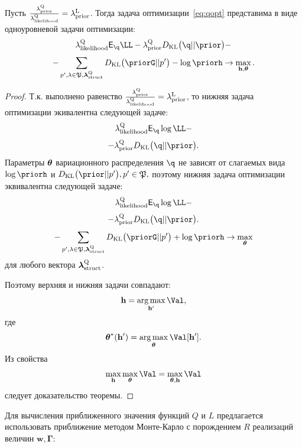 \begin{theorem}
Пусть $\frac{\lambda_\text{prior}^\text{Q}}{\lambda_\text{likelihood}^\text{Q}} = \lambda_\text{prior}^\text{L}$. 
Тогда задача оптимизации~\eqref{eq:qopt} представима в виде одноуровневой задачи оптимизации:
\[
\lamLL \E_{\q}\LL - \lamCQ \KL{\q}{\prior} -
\]
\[
-\sum_{p', \lambda \in \mathfrak{P}, \lamS} \KL{\priorG}{p'} - \log \priorh \to \max_{\h, \teta}. 
\]
\end{theorem}
\begin{proof}
Т.к. выполнено равенство  $\frac{\lambda_\text{prior}^\text{Q}}{\lambda_\text{likelihood}^\text{Q}} = \lambda_\text{prior}^\text{L}$, то нижняя задача оптимизации экивалентна следующей задаче:
\[
\lamLL \E_{\q} \log \LL -  
\]
\[
    -\lamCQ \KL{\q}{\prior}. 
\]
Параметры $\boldsymbol{\theta}$ вариационного распределения $\q$ не зависят от слагаемых вида $\log \priorh$ и $\KL{\prior}{p'}, p' \in \mathfrak{P},$ поэтому нижняя задача оптимизации
эквивалентна следующей задаче:
\[
\lamLL \E_{\q} \log \LL -  
\]
\[
    -\lamCQ \KL{\q}{\prior}. 
\]
\[
-\sum_{p', \lambda \in \mathfrak{P}, \lamS} \KL{\priorG}{p'} + \log \priorh \to \max_{\teta}
\]
для любого вектора $\boldsymbol{\lambda}_\text{struct}^\text{Q}$. 


Поэтому верхняя и нижняя задачи совпадают:
\[
    \h = \argmax_{\h'} \Val,
\]
где 
\[
    \teta^{*}(\h') = \argmax_{\teta} \Val[\h'].
\]
Из свойства 
\[
    \max_{\h}\max_{\teta} \Val = \max_{\teta, \h} \Val
\]
следует доказательство теоремы.
\end{proof}


Для вычисления приближенного значения функций $Q$ и $L$ предлагается использовать приближение методом Монте-Карло с порождением $R$ реализаций величин $\mathbf{w}, \boldsymbol{\Gamma}$:

